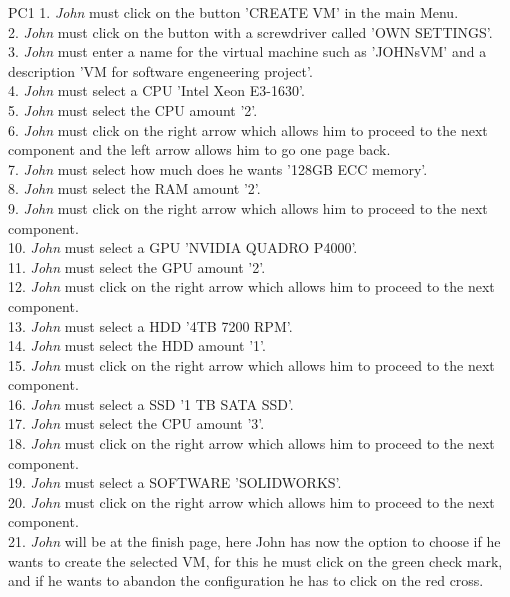 \begin{lyxlist}{PC1}
{1. \emph{John} must click on the button 'CREATE VM' in the main Menu.\\
2. \emph{John} must click on the button with a screwdriver called 'OWN
SETTINGS'.\\
3. \emph{John} must enter a name for the virtual machine such as 'JOHNsVM'
and a description 'VM for software engeneering project'.\\
4. \emph{John} must select a CPU 'Intel Xeon E3-1630'.\\
5. \emph{John} must select the CPU amount '2'.\\
6. \emph{John} must click on the right arrow which allows him to
proceed to the next component and the left arrow allows him to go one page
back.\\
7. \emph{John} must select how much does he wants '128GB ECC memory'.\\
8. \emph{John} must select the RAM amount '2'.\\
9. \emph{John} must click on the right arrow which allows him to
proceed to the next component.\\
10. \emph{John} must select a GPU 'NVIDIA QUADRO P4000'.\\
11. \emph{John} must select the GPU amount '2'.\\
12. \emph{John} must click on the right arrow which allows him to
proceed to the next component.\\
13. \emph{John} must select a HDD '4TB 7200 RPM'.\\
14. \emph{John} must select the HDD amount '1'.\\
15. \emph{John} must click on the right arrow which allows him to
proceed to the next component.\\
16. \emph{John} must select a SSD '1 TB SATA SSD'.\\
17. \emph{John} must select the CPU amount '3'.\\
18. \emph{John} must click on the right arrow which allows him to
proceed to the next component.\\
19. \emph{John} must select a SOFTWARE 'SOLIDWORKS'.\\
20. \emph{John} must click on the right arrow which allows him to
proceed to the next component.\\
21. \emph{John} will be at the finish page, here John has now the option to
choose if he wants to create the selected VM, for this he must click on the
green check mark, and if he wants to abandon the configuration he has to
click on the red cross.\\


}
\end{lyxlist}

